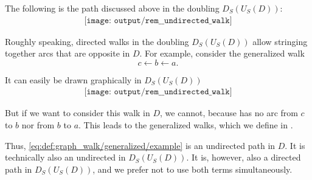 \begin{remark}
  The following is the path discussed above in the doubling \( D_S(U_S(D)) \):
  \begin{equation*}
    \begin{aligned}
      \texttt{[image: output/rem\_\_undirected\_walk]}
    \end{aligned}
  \end{equation*}

  Roughly speaking, directed walks in the doubling \( D_S(U_S(D)) \) allow stringing together arcs that are opposite in \( D \). For example, consider the generalized walk
  \begin{equation}\label{eq:def:graph_walk/generalized/example}
    c \leftarrow b \leftarrow a.
  \end{equation}

  It can easily be drawn graphically in \( D_S(U_S(D)) \)
  \begin{equation*}
    \begin{aligned}
      \texttt{[image: output/rem\_\_undirected\_walk]}
    \end{aligned}
  \end{equation*}

  But if we want to consider this walk in \( D \), we cannot, because has no arc from \( c \) to \( b \) nor from \( b \) to \( a \). This leads to the generalized walks, which we define in .

  Thus, \eqref{eq:def:graph_walk/generalized/example} is an undirected path in \( D \). It is technically also an undirected in \( D_S(U_S(D)) \). It is, however, also a directed path in \( D_S(U_S(D)) \), and we prefer not to use both terms simultaneously.
\end{remark}

